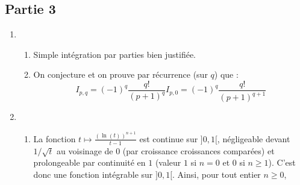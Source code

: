 \documentclass[twoside,french,11pt]{VcCours}
\newcommand{\enc}[1]{\fbox{#1}}
\begin{document}
  \subsection*{Partie 3}
  
  \begin{enumerate}
  \item
  \begin{enumerate}
  \item Simple intégration par parties bien justifiée.
  \item On conjecture et on prouve par récurrence (sur $q$) que :
  $$ \boxed{I_{p,q}=(-1)^q\frac{q!}{(p+1)^q}I_{p,0}=(-1)^q\frac{q!}{(p+1)^{q+1}}}$$
  \end{enumerate}
  \item
  \begin{enumerate}
  \item La fonction $t\mapsto \frac{(\ln(t))^{n+1}}{t-1}$ est continue sur $]0,1[$, négligeable devant $1/\sqrt{t}$ au voisinage de $0$ (par croissance croissances comparées) et prolongeable par continuité en $1$ (valeur $1$ si $n=0$ et $0$ si $n\geq 1$). C'est donc une fonction intégrable sur $]0,1[$. Ainsi, pour tout entier $n \geq 0$,
  \enc{$B_n$ existe}
  

\end{enumerate}
\end{enumerate}
\end{document}

